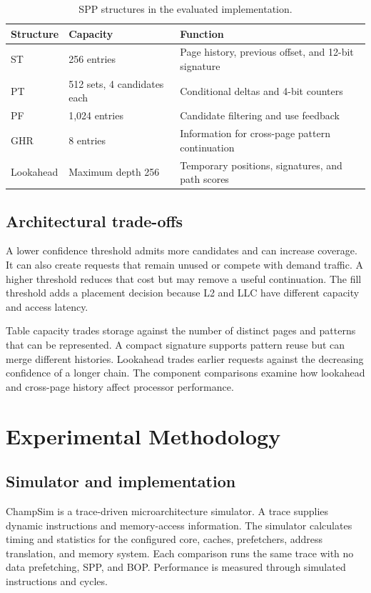 \documentclass[a4paper,11pt]{article}
\begin{document}
\begin{table}[htbp]
\centering
\caption{SPP structures in the evaluated implementation.}\label{tab:structures}
\begin{tabularx}{\linewidth}{@{}p{29mm}p{34mm}Y@{}}
\toprule
Structure & Capacity & Function\\
\midrule
ST & 256 entries & Page history, previous offset, and 12-bit signature\\
PT & 512 sets, 4 candidates each & Conditional deltas and 4-bit counters\\
PF & 1,024 entries & Candidate filtering and use feedback\\
GHR & 8 entries & Information for cross-page pattern continuation\\
Lookahead & Maximum depth 256 & Temporary positions, signatures, and path scores\\
\bottomrule
\end{tabularx}
\end{table}

\subsection{Architectural trade-offs}
A lower confidence threshold admits more candidates and can increase coverage. It can also create requests that remain unused or compete with demand traffic. A higher threshold reduces that cost but may remove a useful continuation. The fill threshold adds a placement decision because L2 and LLC have different capacity and access latency.

Table capacity trades storage against the number of distinct pages and patterns that can be represented. A compact signature supports pattern reuse but can merge different histories. Lookahead trades earlier requests against the decreasing confidence of a longer chain. The component comparisons examine how lookahead and cross-page history affect processor performance.

\section{Experimental Methodology}
\subsection{Simulator and implementation}
ChampSim is a trace-driven microarchitecture simulator\cite{champsim}. A trace supplies dynamic instructions and memory-access information. The simulator calculates timing and statistics for the configured core, caches, prefetchers, address translation, and memory system. Each comparison runs the same trace with no data prefetching, SPP, and BOP. Performance is measured through simulated instructions and cycles.
\end{document}
